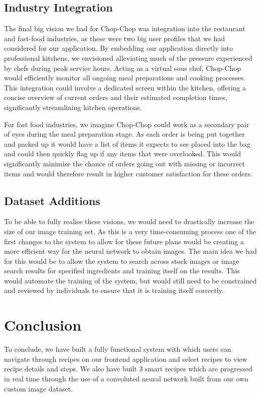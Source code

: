 \documentclass{article}
\begin{document}
\subsection{Industry Integration}
The final big vision we had for Chop-Chop was integration into the restaurant and fast-food industries, as these were two big user profiles that we had considered for our application.
By embedding our application directly into professional kitchens, we envisioned alleviating much of the pressure experienced by chefs during peak service hours. Acting as a virtual sous chef, Chop-Chop would efficiently monitor all ongoing meal preparations and cooking processes. This integration could involve a dedicated screen within the kitchen, offering a concise overview of current orders and their estimated completion times, significantly streamlining kitchen operations.

For fast food industries, we imagine Chop-Chop could work as a secondary pair of eyes during the meal preparation stage. As each order is being put together and packed up it would have a list of items it expects to see placed into the bag and could then quickly flag up if any items that were overlooked. This would significantly minimise the chance of orders going out with missing or incorrect items and would therefore result in higher customer satisfaction for these orders.

\subsection{Dataset Additions}
To be able to fully realise these visions, we would need to drastically increase the size of our image training set. As this is a very time-consuming process one of the first changes to the system to allow for these future plans would be creating a more efficient way for the neural network to obtain images. The main idea we had for this would be to allow the system to search across stock images or image search results for specified ingredients and training itself on the results. This would automate the training of the system, but would still need to be constrained and reviewed by individuals to ensure that it is training itself correctly.

\section{Conclusion}
To conclude, we have built a fully functional system with which users can navigate through recipes on our frontend application and select recipes to view recipe details and steps. We also have built 3 smart recipes which are progressed in real time through the use of a convoluted neural network built from our own custom image dataset.
\end{document}
